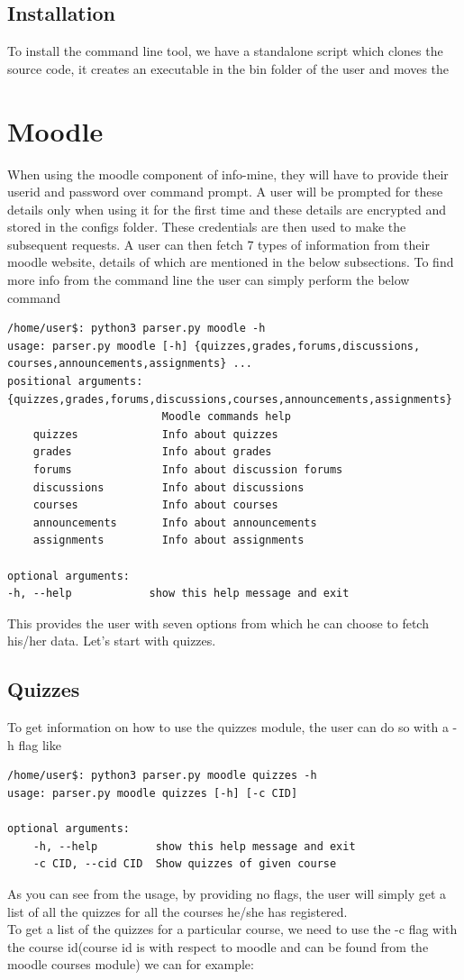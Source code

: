 \documentclass[12pt, letterpaper, twoside]{article}
\begin{document}
    \subsection{Installation}
    To install the command line tool, we have a standalone script which clones the source code, it creates an executable in the bin folder of the user and moves the 

\section{Moodle}
When using the moodle component of info-mine, they will have to provide their userid and password over command prompt.
A user will be prompted for these details only when using it for the first time and these details are encrypted and stored in the configs
folder. 
These credentials are then used to make the subsequent requests.
A user can then fetch 7 types of information from their moodle website, details of which are mentioned in the below subsections.
To find more info from the command line the user can simply perform the below command
\begin{verbatim}
/home/user$: python3 parser.py moodle -h
usage: parser.py moodle [-h] {quizzes,grades,forums,discussions,
courses,announcements,assignments} ...
positional arguments:
{quizzes,grades,forums,discussions,courses,announcements,assignments}
                        Moodle commands help
    quizzes             Info about quizzes
    grades              Info about grades
    forums              Info about discussion forums
    discussions         Info about discussions
    courses             Info about courses
    announcements       Info about announcements
    assignments         Info about assignments

optional arguments:
-h, --help            show this help message and exit

\end{verbatim}
    This provides the user with seven options from which he can choose to fetch his/her data.
    Let's start with quizzes.
\subsection{Quizzes}
To get information on how to use the quizzes module, the user can do so with a -h flag like
\begin{verbatim}
/home/user$: python3 parser.py moodle quizzes -h
usage: parser.py moodle quizzes [-h] [-c CID]

optional arguments:
    -h, --help         show this help message and exit
    -c CID, --cid CID  Show quizzes of given course
\end{verbatim}
As you can see from the usage, by providing no flags, the user will simply get a list of all the quizzes for all the courses he/she has registered.\\
To get a list of the quizzes for a particular course, we need to use the -c flag with the course id(course id is with respect to moodle and can be found from the moodle courses module) we can for example:
\end{document}
